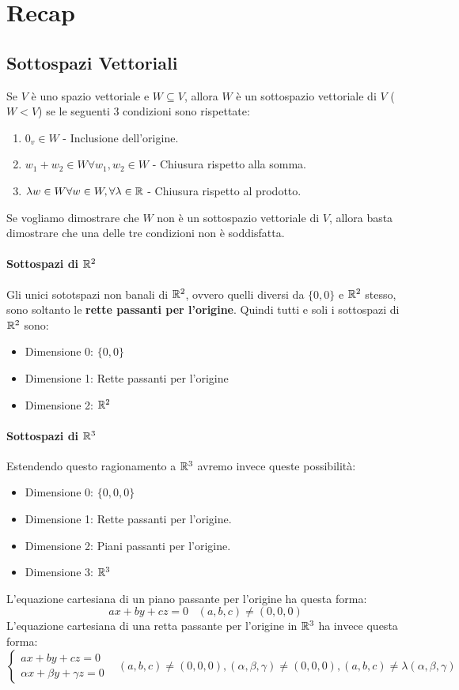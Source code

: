 \section{Recap}
\subsection{Sottospazi Vettoriali}
Se $V$ è uno spazio vettoriale e $W\subseteq V$, allora $W$ è un sottospazio vettoriale di $V$ ($W<V$)
se le seguenti 3 condizioni sono rispettate:
\begin{enumerate}
    \item $0_v\in W$ - Inclusione dell'origine.
    \item $w_1 + w_2 \in W \forall w_1,w_2 \in W$ - Chiusura rispetto alla somma.
    \item $\lambda w \in W \forall w\in W, \forall \lambda \in \mathbb{R}$ - Chiusura rispetto al prodotto.
\end{enumerate}
Se vogliamo dimostrare che $W$ non è un sottospazio vettoriale di $V$, allora basta dimostrare che una delle tre condizioni non è soddisfatta.

\paragraph{Sottospazi di $\mathbb{R}^2$}
Gli unici sototspazi non banali di $\mathbb{R}^2$, ovvero quelli diversi da $\{0,0\}$ e $\mathbb{R}^2$ stesso, sono
soltanto le \textbf{rette passanti per l'origine}.
Quindi tutti e soli i sottospazi di $\mathbb{R}^2$ sono:
\begin{itemize}
    \item Dimensione 0: $\{0,0\}$
    \item Dimensione 1: Rette passanti per l'origine
    \item Dimensione 2: $\mathbb{R}^2$
\end{itemize}

\paragraph{Sottospazi di $\mathbb{R}^3$}
Estendendo questo ragionamento a $\mathbb{R}^3$ avremo invece queste possibilità:
\begin{itemize}
    \item Dimensione 0: $\{0,0,0\}$
    \item Dimensione 1: Rette passanti per l'origine.
    \item Dimensione 2: Piani passanti per l'origine.
    \item Dimensione 3: $\mathbb{R}^3$
\end{itemize}
L'equazione cartesiana di un piano passante per l'origine ha questa forma:
\[ ax + by +cz = 0 \;\;\; (a,b,c) \neq (0,0,0)\]
L'equazione cartesiana di una retta passante per l'origine in $\mathbb{R}^3$ ha invece questa forma:
\[ \begin{cases}
    ax + by +cz = 0 \\
    \alpha x + \beta y +\gamma z = 0
\end{cases}
\;\;\; (a,b,c) \neq (0,0,0), (\alpha,\beta,\gamma ) \neq (0,0,0), (a,b,c) \neq \lambda(\alpha,\beta,\gamma)
\]
